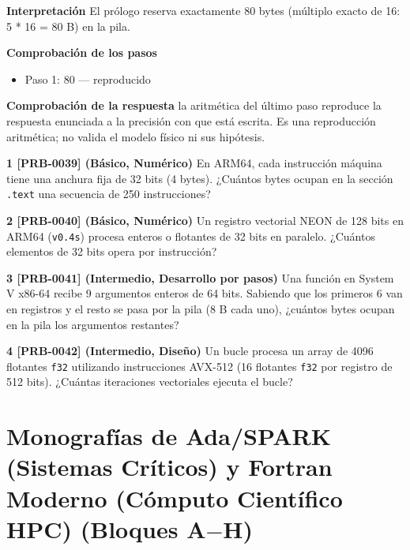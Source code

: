\documentclass{book}
\begin{document}
\begin{tcolorbox}[title={Problema resuelto}, studiumworked, breakable]
\noindent\textbf{Interpretación}
El prólogo reserva exactamente 80 bytes (múltiplo exacto de 16: 5 * 16 = 80 B) en la pila.

\noindent\textbf{Comprobación de los pasos}
\begin{itemize}
\item Paso 1: $80$ — reproducido
\end{itemize}

\noindent\textbf{Comprobación de la respuesta} la aritmética del último paso reproduce la respuesta enunciada a la precisión con que está escrita. Es una reproducción aritmética; no valida el modelo físico ni sus hipótesis.
\end{tcolorbox}

\begin{tcolorbox}[title={Ejercicios}, studiumworked, breakable]

\noindent\textbf{1 [PRB-0039] (Básico, Numérico)}
En ARM64, cada instrucción máquina tiene una anchura fija de 32 bits (4 bytes). ¿Cuántos bytes ocupan en la sección \texttt{.text} una secuencia de 250 instrucciones?

\noindent\textbf{2 [PRB-0040] (Básico, Numérico)}
Un registro vectorial NEON de 128 bits en ARM64 (\texttt{v0.4s}) procesa enteros o flotantes de 32 bits en paralelo. ¿Cuántos elementos de 32 bits opera por instrucción?

\noindent\textbf{3 [PRB-0041] (Intermedio, Desarrollo por pasos)}
Una función en System V x86-64 recibe 9 argumentos enteros de 64 bits. Sabiendo que los primeros 6 van en registros y el resto se pasa por la pila (8 B cada uno), ¿cuántos bytes ocupan en la pila los argumentos restantes?

\noindent\textbf{4 [PRB-0042] (Intermedio, Diseño)}
Un bucle procesa un array de 4096 flotantes \texttt{f32} utilizando instrucciones AVX-512 (16 flotantes \texttt{f32} por registro de 512 bits). ¿Cuántas iteraciones vectoriales ejecuta el bucle?
\end{tcolorbox}

\chapter{Monografías de Ada/SPARK (Sistemas Críticos) y Fortran Moderno (Cómputo Científico HPC) (Bloques A\(-\)H)}
\label{chap:cap08-monografias-ada-spark-tiempo-real-y-fortran-cientifico}
\end{document}
